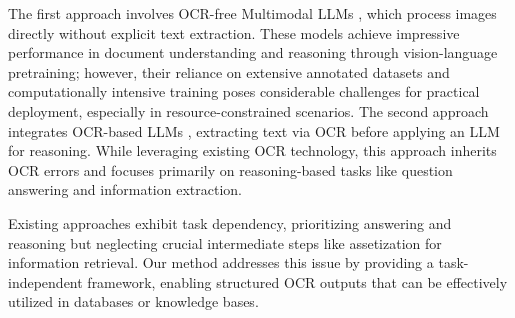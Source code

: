 The first approach involves OCR-free Multimodal LLMs \cite{huang2022layoutlmv3pretrainingdocumentai, liu2024textmonkeyocrfreelargemultimodal, li2021structextstructuredtextunderstanding, kim2022ocrfreedocumentunderstandingtransformer}, which process images directly without explicit text extraction. These models achieve impressive performance in document understanding and reasoning through vision-language pretraining; however, their reliance on extensive annotated datasets and computationally intensive training poses considerable challenges for practical deployment, especially in resource-constrained scenarios. The second approach integrates OCR-based LLMs \cite{perot2024lmdxlanguagemodelbaseddocument, he2023icld3ieincontextlearningdiverse, wang2023docllmlayoutawaregenerativelanguage, lu2024boundingboxworthtoken}, extracting text via OCR before applying an LLM for reasoning. While leveraging existing OCR technology, this approach inherits OCR errors and focuses primarily on reasoning-based tasks like question answering and information extraction.

Existing approaches exhibit task dependency, prioritizing answering and reasoning but neglecting crucial intermediate steps like assetization for information retrieval. Our method addresses this issue by providing a task-independent framework, enabling structured OCR outputs that can be effectively utilized in databases or knowledge bases.


